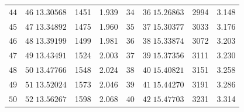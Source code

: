 \begin{center}
\begin{tabular}{|r|r|r|r||r|r|r|r|}
\(44\)&\(46\;13.30568\)&1451&1.939&\(34\)&\(36\;15.26863\)&2994&3.148\\
\(45\)&\(47\;13.34892\)&1475&1.960&\(35\)&\(37\;15.30377\)&3033&3.176\\
\(46\)&\(48\;13.39199\)&1499&1.981&\(36\)&\(38\;15.33874\)&3072&3.203\\
\(47\)&\(49\;13.43491\)&1524&2.003&\(37\)&\(39\;15.37356\)&3111&3.230\\
\(48\)&\(50\;13.47766\)&1548&2.024&\(38\)&\(40\;15.40821\)&3151&3.258\\
\(49\)&\(51\;13.52024\)&1573&2.046&\(39\)&\(41\;15.44270\)&3191&3.286\\
\(50\)&\(52\;13.56267\)&1598&2.068&\(40\)&\(42\;15.47703\)&3231&3.314\\
\hline
\end{tabular}
\end{center}
\endgroup
